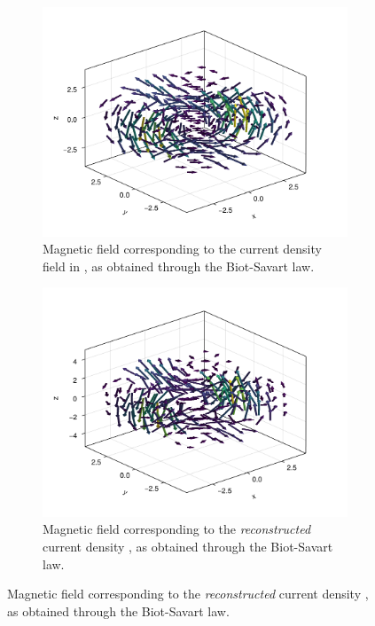 \documentclass[12pt]{article}
\begin{document}

  \begin{figure}[H]
    \centering
    \begin{subfigure}[t]{0.48\textwidth}
      \centering
      \includegraphics[width=\textwidth]{../figures/cdpr-b-field.pdf}
      \caption{Magnetic field corresponding to the current density field in , as obtained through the Biot-Savart law.}
      \label{fig:cdpr-b-field}
    \end{subfigure}
    \hfill
    \begin{subfigure}[t]{0.48\textwidth}
      \centering
      \includegraphics[width=\textwidth]{../figures/cdprr-b-field.pdf}
      \caption{Magnetic field corresponding to the \textit{reconstructed} current density , as obtained through the Biot-Savart law.}
      \label{fig:cdprr-b-field}
    \end{subfigure}
  \end{figure}
\end{document}
